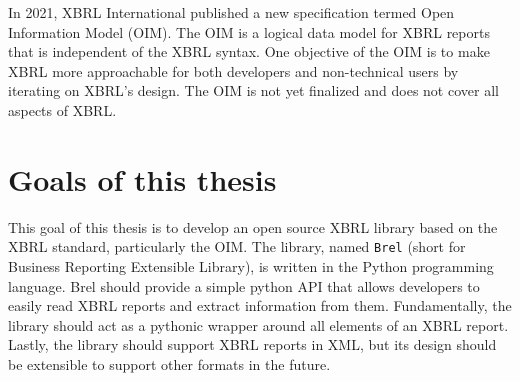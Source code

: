 In 2021, XBRL International published a new specification termed Open Information Model (OIM)\cite{oim}.
The OIM is a logical data model for XBRL reports that is independent of the XBRL syntax.
One objective of the OIM is to make XBRL more approachable for both developers and non-technical users by iterating on XBRL's design.
The OIM is not yet finalized and does not cover all aspects of XBRL. 


\section{Goals of this thesis}
\label{sec:goals}

This goal of this thesis is to develop an open source XBRL library based on the XBRL standard, particularly the OIM.
The library, named \texttt{Brel} (short for Business Reporting Extensible Library), is written in the Python programming language.
Brel should provide a simple python API that allows developers to easily read XBRL reports and extract information from them.
Fundamentally, the library should act as a pythonic wrapper around all elements of an XBRL report.
Lastly, the library should support XBRL reports in XML, but its design should be extensible to support other formats in the future.

